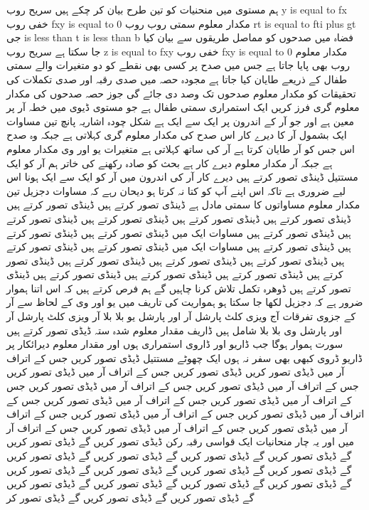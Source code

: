 ہم مستوی میں منحنیات کو تین طرح بیان کر چکے ہیں
سریح روب y is equal to fx
خفی روب fxy is equal to 0
مکدار معلوم سمتی روب
روب rt is equal to fti plus gt
جی is less than t is less than b
فضاہ میں صدحوں کو مماصل طریقوں سے بیان کیا جا سکتا ہے
سریح روب z is equal to fxy
خفی روب fxy is equal to 0
مکدار معلوم روب بھی پایا جاتا ہے
جس میں صدح پر کسی بھی نقطے کو دو متغیرات والے سمتی طفال کے ذریعے
طایان کیا جاتا ہے
مجودہ حصہ میں صدی رقبہ اور صدی تکملات کی تحقیقات کو مکدار معلوم صدحوں تک وصد دی جائے گی
جوز حصہ صدحوں کی مکدار معلوم گری
فرز کریں
ایک استمراری سمتی طفال ہے
جو مستوی ڈیوی میں خطہ آر پر معین ہے
اور جو آر کے اندرون پر ایک سے ایک ہے
شکل چودہ اشاریہ پانچ تین
مساوات ایک بشمول آر کا دیرے کار اس صدح کی مکدار معلوم گری کہلاتی ہے
جبکہ وہ صدح اس جس کو آر طایان کرتا ہے
آر کی ساتھ کہلاتی ہے
متغیرات یو اور وی مکدار معلوم ہے جبکہ آر مکدار معلوم دیرے کار ہے
بحث کو صادہ رکھنے کی خاتر ہم آر کو ایک مستتیل ڈینڈی تصور کرتے ہیں
دیرے کار آر کی اندرون میں آر کو ایک سے ایک ہونا اس لیے ضروری ہے
تاکہ اس اپنے آپ کو کتا نہ کرتا ہو
دیحان رہے کہ مساوات دجزیل تین مکدار معلوم مساواتوں کا سمتی مادل ہے
ڈینڈی تصور کرتے ہیں
ڈینڈی تصور کرتے ہیں
ڈینڈی تصور کرتے ہیں
ڈینڈی تصور کرتے ہیں
ڈینڈی تصور کرتے ہیں
ڈینڈی تصور کرتے ہیں
ڈینڈی تصور کرتے ہیں
مساوات ایک میں ڈینڈی تصور کرتے ہیں
ڈینڈی تصور کرتے ہیں
ڈینڈی تصور کرتے ہیں
مساوات ایک میں ڈینڈی تصور کرتے ہیں
ڈینڈی تصور کرتے ہیں
ڈینڈی تصور کرتے ہیں
ڈینڈی تصور کرتے ہیں
ڈینڈی تصور کرتے ہیں
ڈینڈی تصور کرتے ہیں
ڈینڈی تصور کرتے ہیں
ڈینڈی تصور کرتے ہیں
ڈینڈی تصور کرتے ہیں
ڈینڈی تصور کرتے ہیں
ڈوھرہ تکمل تلاش کرنا چاہیں گے
ہم فرص کرتے ہیں کہ اس اتنا ہموار ضرور ہے کہ دجزیل لکھا جا سکتا ہو
ہمواریت کی تاریف میں یو اور وی کے لحاظ سے آر کے جزوی تفرقات آج ویزی کلٹ پارشل آر اور پارشل یو بلا بلا آر ویزی کلٹ پارشل آر اور پارشل وی بلا بلا شامل ہیں
ڈاریف مقدار معلوم شدہ ستہ ڈیڈی تصور کرتے ہیں
سورت ہموار ہوگا جب ڈاریو اور ڈاروی استمراری ہوں اور مقدار معلوم دیرائکار پر ڈاریو ڈروی کبھی بھی سفر نہ ہوں
ایک چھوٹے مستتیل ڈیڈی تصور کریں جس کے اتراف آر میں ڈیڈی تصور کریں
ڈیڈی تصور کریں جس کے اتراف آر میں ڈیڈی تصور کریں جس کے اتراف آر میں ڈیڈی تصور کریں جس کے اتراف آر میں ڈیڈی تصور کریں جس کے اتراف آر میں ڈیڈی تصور کریں جس کے اتراف آر میں ڈیڈی تصور کریں جس کے اتراف آر میں ڈیڈی تصور کریں جس کے اتراف آر میں ڈیڈی تصور کریں جس کے اتراف آر میں ڈیڈی تصور کریں جس کے اتراف آر میں ڈیڈی تصور کریں جس کے اتراف آر میں
اور یہ چار منحانیات ایک قواسی رقبہ رکن ڈیڈی تصور کریں گے
ڈیڈی تصور کریں گے ڈیڈی تصور کریں گے ڈیڈی تصور کریں گے ڈیڈی تصور کریں گے ڈیڈی تصور کریں گے ڈیڈی تصور کریں گے ڈیڈی تصور کریں گے ڈیڈی تصور کریں گے ڈیڈی تصور کریں گے ڈیڈی تصور کریں گے ڈیڈی تصور کریں گے ڈیڈی تصور کریں گے ڈیڈی تصور کریں گے ڈیڈی تصور کریں گے ڈیڈی تصور کریں گے ڈیڈی تصور کر
